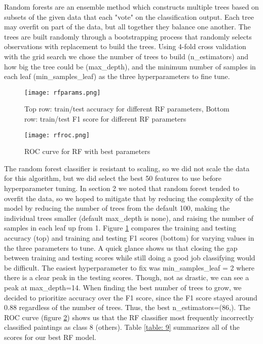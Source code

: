 \documentclass[12pt]{article}
\begin{document}
Random forests are an ensemble method which constructs multiple trees based on subsets of the given data that each "vote" on the classification output.  Each tree may overfit on part of the data, but all together they balance one another. The trees are built randomly through a bootstrapping process that randomly selects observations with replacement to build the trees. Using 4-fold cross validation with the grid search we chose the number of trees to build (n\_estimators) and how big the tree could be (max\_depth), and the minimum number of samples in each leaf (min\_samples\_leaf) as the three hyperparameters to fine tune. 

\begin{figure}[h]
	\centering
	\texttt{[image: rfparams.png]}
	\caption{Top row: train/test accuracy for different RF parameters, Bottom row: train/test F1 score for different RF parameters}
	\label{rfparams}
\end{figure}

\begin{figure}[h]
	\centering
	\texttt{[image: rfroc.png]}
	\caption{ROC curve for RF with best parameters}
	\label{rfroc}
\end{figure}

\FloatBarrier

The random forest classifier is resistant to scaling, so we did not scale the data for this algorithm, but we did select the best 50 features to use before hyperparameter tuning. In section 2 we noted that random forest tended to overfit the data, so we hoped to mitigate that by reducing the complexity of the model by reducing the number of trees from the default 100, making the individual trees smaller (default max\_depth is none), and raising the number of samples in each leaf up from 1. Figure \ref{rfparams} compares the training and testing accuracy (top) and training and testing F1 scores (bottom) for varying values in the three parameters to tune. A quick glance shows us that closing the gap between training and testing scores while still doing a good job classifying would be difficult. The easiest hyperparameter to fix was min\_samples\_leaf = 2 where there is a clear peak in the testing scores. Though, not as drastic, we can see a peak at max\_depth=14. When finding the best number of trees to grow, we decided to prioritize accuracy over the F1 score, since the F1 score stayed around 0.88 regardless of the number of trees. Thus, the best n\_estimators=(86,). The ROC curve (figure \ref{rfroc})  shows us that the RF classifier most frequently incorrectly classified paintings as class 8 (others). Table \ref{table: 9} summarizes all of the scores for our best RF model.
\end{document}
